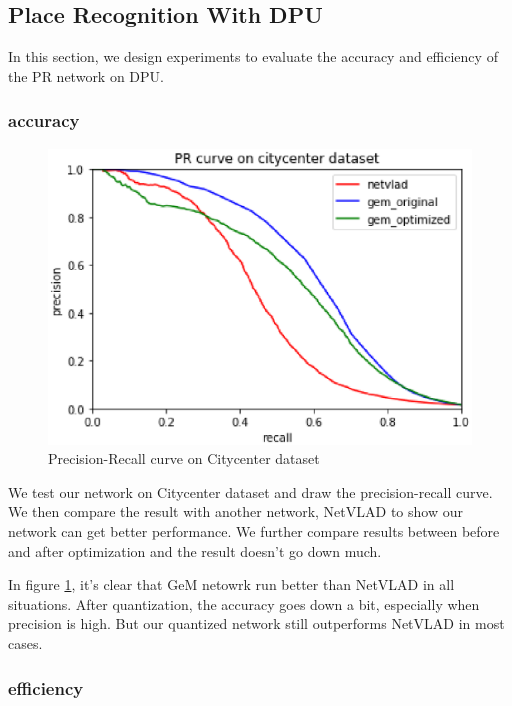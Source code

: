


\subsection{ Place Recognition With DPU }

In this section, we design experiments to evaluate the accuracy and efficiency of the PR network on DPU.

\subsubsection{accuracy}

\begin{figure}[ht]
    \centering
    \includegraphics[width=0.8\linewidth]{fig/result.eps}
    \caption{Precision-Recall curve on Citycenter dataset}
    \label{fig:PRcurve}
\end{figure}

We test our network on Citycenter dataset \cite{citycenter} and draw the precision-recall curve. We then compare the result with another network, NetVLAD \cite{netvlad} to show our network can get better performance. We further compare results between before and after optimization and the result doesn't go down much.

In figure \ref{fig:PRcurve}, it's clear that GeM netowrk run better than NetVLAD in all situations. After quantization, the accuracy goes down a bit, especially when precision is high. But our quantized network still outperforms NetVLAD in most cases.

\subsubsection{efficiency}

